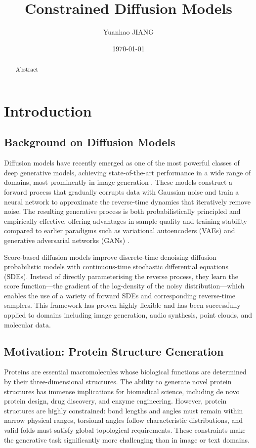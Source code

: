 \documentclass[12pt]{report}
\title{Constrained Diffusion Models}
\date{\today}
\author{Yuanhao JIANG}
\begin{document}
\maketitle

\begin{abstract}
    Abstract
\end{abstract}

\tableofcontents
{}
\newpage
{}

\chapter{Introduction}
\section{Background on Diffusion Models}
Diffusion models have recently emerged as one of the most powerful classes of deep generative models, achieving state-of-the-art performance in a wide range of domains, most prominently in image generation \cite{hoDenoisingDiffusionProbabilistic2020, dhariwal2021DiffusionModelsBeat}. These models construct a forward process that gradually corrupts data with Gaussian noise and train a neural network to approximate the reverse-time dynamics that iteratively remove noise. The resulting generative process is both probabilistically principled and empirically effective, offering advantages in sample quality and training stability compared to earlier paradigms such as variational autoencoders (VAEs) \cite{kingma2022AutoEncodingVariationalBayes} and generative adversarial networks (GANs) \cite{goodfellow2020GenerativeAdversarialNetworks}.

Score-based diffusion models \cite{song2020score,songMaximumLikelihoodTraining2021} improve discrete-time denoising diffusion probabilistic models with continuous-time stochastic differential equations (SDEs). Instead of directly parameterising the reverse process, they learn the score function---the gradient of the log-density of the noisy distribution---which enables the use of a variety of forward SDEs and corresponding reverse-time samplers. This framework has proven highly flexible and has been successfully applied to domains including image generation, audio synthesis, point clouds, and molecular data.

\section{Motivation: Protein Structure Generation}
Proteins are essential macromolecules whose biological functions are determined by their three-dimensional structures. The ability to generate novel protein structures has immense implications for biomedical science, including de novo protein design, drug discovery, and enzyme engineering. However, protein structures are highly constrained: bond lengths and angles must remain within narrow physical ranges, torsional angles follow characteristic distributions, and valid folds must satisfy global topological requirements. These constraints make the generative task significantly more challenging than in image or text domains.
\end{document}
